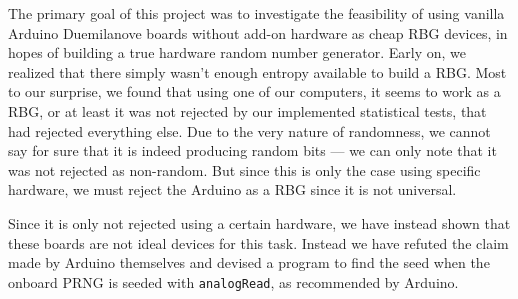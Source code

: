 \documentclass[a4paper]{article}           %
\begin{document}
The primary goal of this project was to investigate the feasibility of using vanilla Arduino Duemilanove boards without add-on hardware as cheap RBG devices, in hopes of building a true hardware random number generator. Early on, we realized that there simply wasn't enough entropy available to build a RBG. Most to our surprise, we found that using one of our computers, it seems to work as a RBG, or at least it was not rejected by our implemented statistical tests, that had rejected everything else. Due to the very nature of randomness, we cannot say for sure that it is indeed producing random bits --- we can only note that it was not rejected as non-random. But since this is only the case using specific hardware, we must reject the Arduino as a RBG since it is not universal. 


Since it is only not rejected using a certain hardware, we have instead shown that these boards are not ideal devices for this task. Instead we have refuted the claim made by Arduino themselves and devised a program to find the seed when the onboard PRNG is seeded with \texttt{analogRead}, as recommended by Arduino. 

{}

\end{document}
